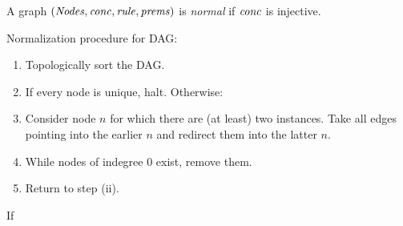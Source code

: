 \begin{definition}
    A graph $(\mathit{Nodes},\mathit{conc},\mathit{rule},\mathit{prems})$
    is \emph{normal} if
    $\mathit{conc}$ is injective.
\end{definition}

Normalization procedure for DAG:
\begin{enumerate}[label=(\roman*)]
    \item Topologically sort the DAG.
    \item If every node is unique, halt. Otherwise:
    \item Consider node $n$ for which there are (at least) two instances.
        Take all edges pointing into the earlier $n$ and redirect them into the latter $n$.
    \item While nodes of indegree 0 exist, remove them.
    \item Return to step (ii).
\end{enumerate}

\begin{conjecture}
If 
\end{conjecture}
